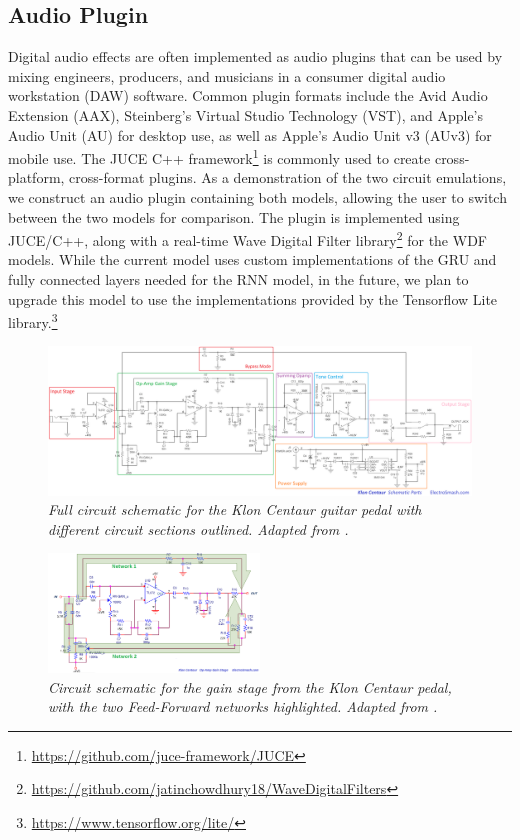 \documentclass[twoside,a4paper]{article}
\begin{document}
\subsection{Audio Plugin}
Digital audio effects are often implemented as audio plugins that
can be used by mixing engineers, producers, and musicians in a
consumer digital audio workstation (DAW) software. Common plugin
formats include the Avid Audio Extension (AAX), Steinberg's Virtual
Studio Technology (VST), and Apple's Audio Unit (AU) for desktop use,
as well as Apple's Audio Unit v3 (AUv3) for mobile use. The JUCE C++
framework\footnote{\url{https://github.com/juce-framework/JUCE}} is
commonly used to create cross-platform, cross-format plugins.
\newline\newline
As a demonstration of the two circuit emulations, we construct an audio
plugin containing both models, allowing the user to switch
between the two models for comparison. The plugin is implemented using
JUCE/C++, along with a real-time Wave Digital Filter
library\footnote{\url{https://github.com/jatinchowdhury18/WaveDigitalFilters}}
for the WDF models. While the current model uses custom implementations
of the GRU and fully connected layers needed for the RNN model, in the
future, we plan to upgrade this model to use the implementations provided
by the Tensorflow Lite library.\footnote{\url{https://www.tensorflow.org/lite/}}
%
\begin{figure}
    \centering
    \includegraphics[width=1.0\textwidth]{FullCircuit.png}
    \caption{\label{fig:fullcircuit} {\it Full circuit schematic
    for the Klon Centaur guitar pedal with different circuit
    sections outlined. Adapted from \cite{electrosmash}.}}
\end{figure}
%
\begin{figure}
    \centering
    \includegraphics[width=0.5\textwidth]{GainStageCircuit.png}
    \caption{\label{fig:gaincircuit} {\it Circuit schematic for the
    gain stage from the Klon Centaur pedal, with the two Feed-Forward
    networks highlighted. Adapted from \cite{electrosmash}.}}
\end{figure}
\end{document}
